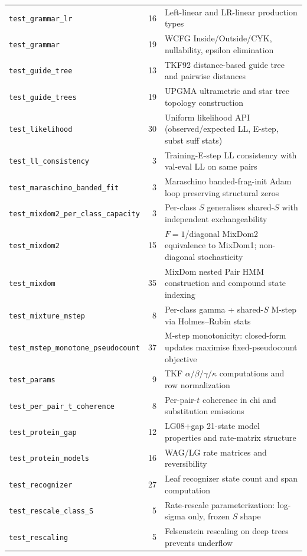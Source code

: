 \begin{table}[htbp]
\begin{tabular}{@{}lrl@{}}
\texttt{test\_grammar\_lr} & 16 & Left-linear and LR-linear production types \\
\texttt{test\_grammar} & 19 & WCFG Inside/Outside/CYK, nullability, epsilon elimination \\
\texttt{test\_guide\_tree} & 13 & TKF92 distance-based guide tree and pairwise distances \\
\texttt{test\_guide\_trees} & 19 & UPGMA ultrametric and star tree topology construction \\
\texttt{test\_likelihood} & 30 & Uniform likelihood API (observed/expected LL, E-step, subst suff stats) \\
\texttt{test\_ll\_consistency} & 3 & Training-E-step LL consistency with val-eval LL on same pairs \\
\texttt{test\_maraschino\_banded\_fit} & 3 & Maraschino banded-frag-init Adam loop preserving structural zeros \\
\texttt{test\_mixdom2\_per\_class\_capacity} & 3 & Per-class $S$ generalises shared-$S$ with independent exchangeability \\
\texttt{test\_mixdom2} & 15 & $F{=}1$/diagonal MixDom2 equivalence to MixDom1; non-diagonal stochasticity \\
\texttt{test\_mixdom} & 35 & MixDom nested Pair HMM construction and compound state indexing \\
\texttt{test\_mixture\_mstep} & 8 & Per-class gamma + shared-$S$ M-step via Holmes--Rubin stats \\
\texttt{test\_mstep\_monotone\_pseudocount} & 37 & M-step monotonicity: closed-form updates maximise fixed-pseudocount objective \\
\texttt{test\_params} & 9 & TKF $\alpha/\beta/\gamma/\kappa$ computations and row normalization \\
\texttt{test\_per\_pair\_t\_coherence} & 8 & Per-pair-$t$ coherence in chi and substitution emissions \\
\texttt{test\_protein\_gap} & 12 & LG08+gap 21-state model properties and rate-matrix structure \\
\texttt{test\_protein\_models} & 16 & WAG/LG rate matrices and reversibility \\
\texttt{test\_recognizer} & 27 & Leaf recognizer state count and span computation \\
\texttt{test\_rescale\_class\_S} & 5 & Rate-rescale parameterization: log-sigma only, frozen $S$ shape \\
\texttt{test\_rescaling} & 5 & Felsenstein rescaling on deep trees prevents underflow \\

\end{tabular}
\end{table}
